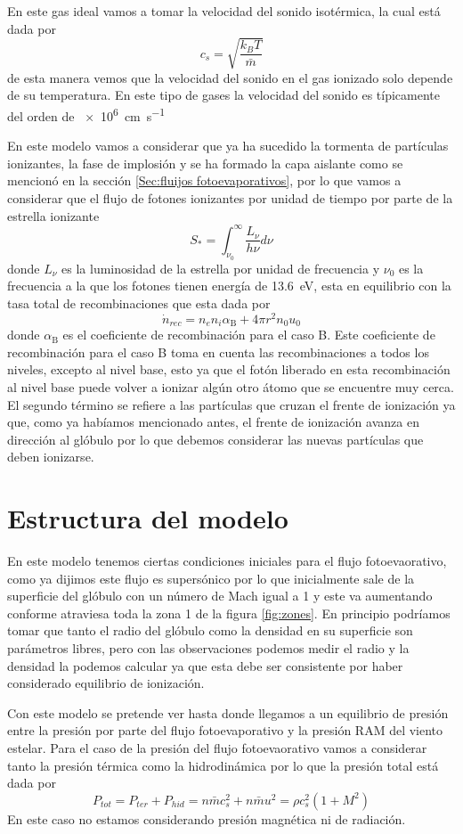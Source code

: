 \documentclass{book}
\begin{document}
En este gas ideal vamos a tomar la velocidad del sonido isotérmica, la cual está dada por
\[c_s  = \sqrt{\frac{k_B T}{\bar{m}}}\] de esta manera vemos que la velocidad del sonido en el gas ionizado solo depende de su temperatura. En este tipo de gases la velocidad del sonido es típicamente del orden de \SI{e6}{cm.s^{-1}}


En este modelo vamos a considerar que  ya ha sucedido la tormenta de partículas ionizantes, la fase de implosión y se ha formado la capa aislante como se mencionó en la sección \ref{Sec:fluijos fotoevaporativos}, por lo que vamos a considerar que el flujo de fotones ionizantes por unidad de tiempo por parte de la estrella ionizante 
\[S_* = \int_{\nu_0}^\infty \frac{L_\nu}{h\nu}d\nu\] donde $L_\nu$ es la luminosidad de la estrella por unidad de frecuencia y $\nu_0$ es la frecuencia a la que los fotones tienen energía de \SI{13.6}{eV}, esta en equilibrio con la tasa total de recombinaciones que esta dada por 
\[\dot{n}_{rec}=n_e n_i \alpha_\mathrm{B}+4\pi r^2n_0u_0\] donde $\alpha_\mathrm{B}$ es el coeficiente de recombinación para el caso B. Este coeficiente de recombinación para el caso B toma en cuenta las recombinaciones a todos los niveles, excepto al nivel base, esto ya que el fotón liberado en esta recombinación al nivel base puede volver a ionizar algún otro átomo que se encuentre muy cerca. El segundo término se refiere a las partículas que cruzan el frente de ionización ya que, como ya habíamos mencionado antes, el frente de ionización avanza en dirección al glóbulo por lo que debemos considerar las nuevas partículas que deben ionizarse. 

\section{Estructura del modelo}\label{Estructura}

En este modelo tenemos ciertas condiciones iniciales para el flujo fotoevaorativo, como ya dijimos este flujo es supersónico por lo que inicialmente sale de la superficie del glóbulo con un número de Mach igual a 1 y este va aumentando conforme atraviesa toda la zona 1 de la figura \ref{fig:zones}. En principio podríamos tomar que tanto el radio del glóbulo como la densidad en su superficie son parámetros libres, pero con las observaciones podemos medir el radio y la densidad la podemos calcular ya que esta debe ser consistente por haber considerado equilibrio de ionización.

Con este modelo se pretende ver hasta donde llegamos a un equilibrio de presión entre la presión por parte del flujo fotoevaporativo y la presión RAM del viento estelar. Para el caso de la presión del flujo fotoevaorativo vamos a considerar tanto la presión térmica como la hidrodinámica por lo que la presión total está dada por
\[P_{tot}=P_{ter}+P_{hid}=n\bar{m}c_s^2+n\bar{m}u^2=\rho c_s^2(1+M^2)\]
En este caso no estamos considerando presión magnética ni de radiación.
\end{document}
